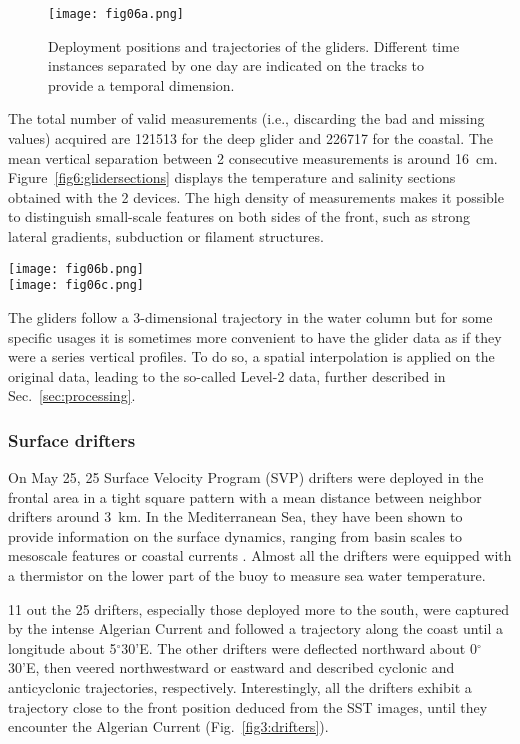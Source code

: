 \documentclass[essd]{copernicus}
\begin{document}
\begin{figure}[t]
\texttt{[image: fig06a.png]}
\caption{Deployment positions and trajectories of the gliders. Different time instances separated by one day are indicated on the tracks to provide a temporal dimension.\label{fig6:glidertracks}}
\end{figure}

The total number of valid measurements (i.e., discarding the bad and missing values) acquired are 121513 for the deep glider and 226717 for the coastal. The mean vertical separation between 2 consecutive measurements is around 16~cm. Figure~\ref{fig6:glidersections} displays the temperature and salinity sections obtained with the 2 devices. The high density of measurements makes it possible to distinguish small-scale features on both sides of the front, such as strong lateral gradients, subduction or filament structures.  

\begin{figure*}[t]
\texttt{[image: fig06b.png]}\\
\texttt{[image: fig06c.png]}
\caption{Temperature and salinity measured by the two gliders. The front position is shown as a dashed, grey line.\label{fig6:glidersections}}
\end{figure*}

The gliders follow a 3-dimensional trajectory in the water column but for some specific usages it is sometimes more convenient to have the glider data as if they were a series vertical profiles. To do so, a spatial interpolation is applied on the original data, leading to the so-called Level-2 data, further described in Sec.~\ref{sec:processing}.


\subsubsection{Surface drifters}

On May 25, 25 Surface Velocity Program (SVP) drifters were deployed in the frontal area in a tight square pattern with a mean distance between neighbor drifters around 3~km. In the Mediterranean Sea, they have been shown to provide information on the surface dynamics, ranging from basin scales to mesoscale features or coastal currents \citep{POULAIN13}. Almost all the drifters were equipped with a thermistor on the lower part of the buoy to measure sea water temperature. 

11 out the 25 drifters, especially those deployed more to the south, were captured by the intense Algerian Current and followed a trajectory along the coast until a longitude about 5$^{\circ}$30'E. The other drifters were deflected northward about 0$^{\circ}$30'E, then veered northwestward or eastward 
and described cyclonic and anticyclonic trajectories, respectively. Interestingly, all the drifters exhibit a trajectory close to the front position deduced from the SST images, until they encounter the Algerian Current (Fig.~\ref{fig3:drifters}). 
\end{document}
